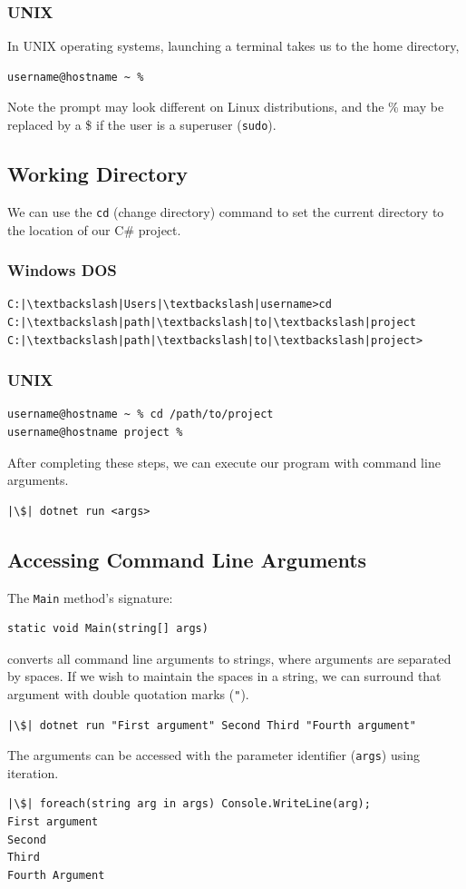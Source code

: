 \documentclass{article}
\begin{document}
\subsubsection{UNIX}
In UNIX operating systems, launching a terminal takes us to the home
directory,
\begin{verbatim}
username@hostname ~ %
\end{verbatim}
Note the prompt may look different on Linux distributions, and the \%
may be replaced by a \$ if the user is a superuser
(\texttt{sudo}).
\subsection{Working Directory}
We can use the \texttt{cd} (change directory) command to
set the current directory to the location of our C\# project.
\subsubsection{Windows DOS}
\begin{verbatim}
C:|\textbackslash|Users|\textbackslash|username>cd C:|\textbackslash|path|\textbackslash|to|\textbackslash|project
C:|\textbackslash|path|\textbackslash|to|\textbackslash|project>
\end{verbatim}
\subsubsection{UNIX}
\begin{verbatim}
username@hostname ~ % cd /path/to/project
username@hostname project %
\end{verbatim}
After completing these steps, we can execute our program with command
line arguments.
\begin{verbatim}
|\$| dotnet run <args>
\end{verbatim}
\subsection{Accessing Command Line Arguments}
The \texttt{Main} method's signature:
\begin{verbatim}
static void Main(string[] args)
\end{verbatim}
converts all command line arguments to strings, where arguments are
separated by spaces. If we wish to maintain the spaces in a string, we
can surround that argument with double quotation marks
(\texttt{"}).
\begin{verbatim}
|\$| dotnet run "First argument" Second Third "Fourth argument"
\end{verbatim}
The arguments can be accessed with the parameter identifier
(\texttt{args}) using iteration.
\begin{verbatim}
|\$| foreach(string arg in args) Console.WriteLine(arg);
First argument
Second
Third
Fourth Argument
\end{verbatim}
\end{document}
